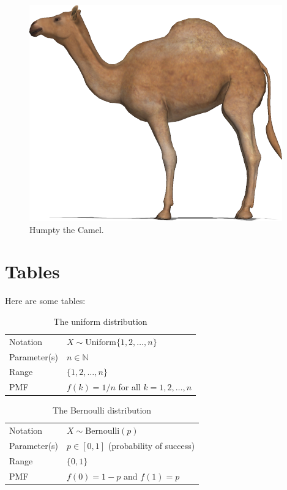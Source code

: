\documentclass{camel}
\begin{document}
\begin{figure}[htb]
\centering
\includegraphics[scale=0.25]{figures/humpty.png}
\caption{Humpty the Camel.}
\label{humpty-the-camel}
\end{figure}

\section{Tables}\label{sec:tables}
Here are some tables:

\begin{table}
\begin{tabular}{ll}\hline
Notation		& $X\sim\text{Uniform}\{1,2,\ldots,n\}$ \\
Parameter(s)	& $n\in\mathbb{N}$ \\
Range			& $\{1,2,\ldots,n\}$ \\
PMF				& $f(k) = 1/n$ for all $k=1,2,\ldots,n$ \\ \hline
\end{tabular}
\caption{The uniform distribution}
\end{table}

\begin{table}
\begin{tabular}{ll}\hline
Notation			& $X\sim\text{Bernoulli}(p)$ \\
Parameter(s)		& $p \in [0,1]$ \quad (probability of success) \\
Range			& $\{0,1\}$ \\
PMF				& $f(0) = 1-p$ and $f(1) = p$ \\ \hline
\end{tabular}
\caption{The Bernoulli distribution}
\end{table}
\end{document}

